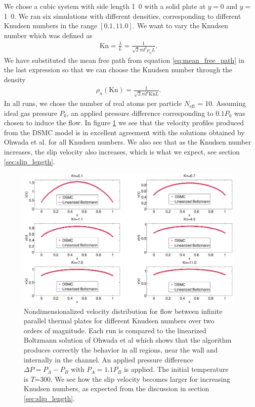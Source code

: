 We chose a cubic system with side length \unit{1.0}{\micro\meter} with a solid plate at $y=$\unit{0}{\micro\meter} and $y=$\unit{1.0}{\micro\meter}. We ran six simulations with different densities, corresponding to different Knudsen numbers in the range $[0.1, 11.0]$. We want to vary the Knudsen number which was defined as
\begin{align}
	\text{Kn} = \frac{\lambda}{L} = \frac{1}{\sqrt 2 \pi d^2 \rho_n L}.
\end{align}
We have substituted the mean free path from equation \eqref{eq:mean_free_path} in the last expression so that we can choose the Knudsen number through the density
\begin{align}
	\rho_n(\text{Kn}) = \frac{1}{\sqrt 2 \pi d^2 \text{Kn}L}.
\end{align}
In all runs, we chose the number of real atoms per particle $N_\text{eff}$ = 10. Assuming ideal gas pressure $P_0$, an applied pressure difference corresponding to $0.1P_0$ was chosen to induce the flow. In figure \ref{fig:dsmc_validation_poiseuille} we see that the velocity profiles produced from the DSMC model is in excellent agreement with the solutions obtained by Ohwada et al. for all Knudsen numbers. We also see that as the Knudsen number increases, the slip velocity also increases, which is what we expect, see section \ref{sec:slip_length}.
\begin{figure}[htpb]
\includegraphics[width=\textwidth, trim=6cm 0cm 5cm 0cm, clip]{DSMC/figures/validation_poiseuille.eps}
\centering
\caption{Nondimensionalized velocity distribution for flow between infinite parallel thermal plates for different Knudsen numbers over two orders of magnitude. Each run is compared to the linearized Boltzmann solution of Ohwada et al\cite{ohwada1989numerical} which shows that the algorithm produces correctly the behavior in all regions, near the wall and internally in the channel. An applied pressure difference $\Delta P = P_A - P_B$ with $P_A = 1.1P_B$ is applied. The initial temperature is $T$=\unit{300}{\kelvin}. We see how the slip velocity becomes larger for increasing Knudsen numbers, as expected from the discussion in section \ref{sec:slip_length}. }
\label{fig:dsmc_validation_poiseuille}
\end{figure}
